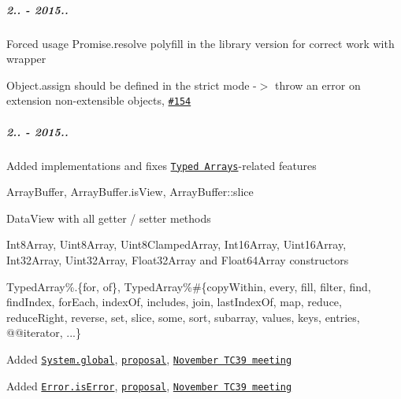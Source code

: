 \subparagraph*{2.. -\/ 2015..}


\begin{DoxyItemize}
\item Forced usage {\ttfamily Promise.\+resolve} polyfill in the {\ttfamily library} version for correct work with wrapper
\item {\ttfamily Object.\+assign} should be defined in the strict mode -\/$>$ throw an error on extension non-\/extensible objects, \href{https://github.com/zloirock/core-js/issues/154}{\tt \#154}
\end{DoxyItemize}

\subparagraph*{2.. -\/ 2015..}


\begin{DoxyItemize}
\item Added implementations and fixes \href{https://github.com/zloirock/core-js#ecmascript-6-typed-arrays}{\tt Typed Arrays}-\/related features
\begin{DoxyItemize}
\item {\ttfamily Array\+Buffer}, {\ttfamily Array\+Buffer.\+is\+View}, {\ttfamily Array\+Buffer\+::slice}
\item {\ttfamily Data\+View} with all getter / setter methods
\item {\ttfamily Int8\+Array}, {\ttfamily Uint8\+Array}, {\ttfamily Uint8\+Clamped\+Array}, {\ttfamily Int16\+Array}, {\ttfamily Uint16\+Array}, {\ttfamily Int32\+Array}, {\ttfamily Uint32\+Array}, {\ttfamily Float32\+Array} and {\ttfamily Float64\+Array} constructors
\item {\ttfamily Typed\+Array\%.\{for, of\}}, {\ttfamily Typed\+Array\%\#\{copy\+Within, every, fill, filter, find, find\+Index, for\+Each, index\+Of, includes, join, last\+Index\+Of, map, reduce, reduce\+Right, reverse, set, slice, some, sort, subarray, values, keys, entries, @@iterator, ...\}}
\end{DoxyItemize}
\item Added \href{https://github.com/zloirock/core-js#ecmascript-7-proposals}{\tt {\ttfamily System.\+global}}, \href{https://github.com/tc39/proposal-global}{\tt proposal}, \href{https://github.com/rwaldron/tc39-notes/tree/master/es7/2015-11/nov-19.md#systemglobal-jhd}{\tt November T\+C39 meeting}
\item Added \href{https://github.com/zloirock/core-js#ecmascript-7-proposals}{\tt {\ttfamily Error.\+is\+Error}}, \href{https://github.com/ljharb/proposal-is-error}{\tt proposal}, \href{https://github.com/rwaldron/tc39-notes/tree/master/es7/2015-11/nov-19.md#jhd-erroriserror}{\tt November T\+C39 meeting}

\end{DoxyItemize}
